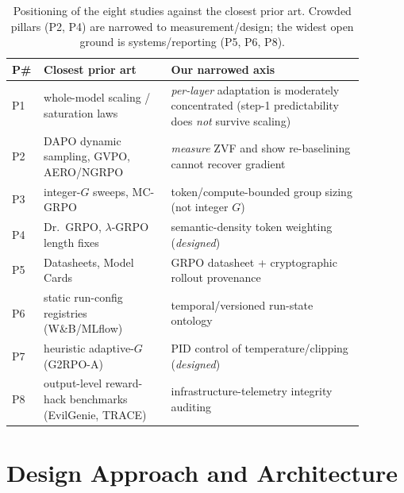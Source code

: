 \documentclass[12pt,a4paper]{report}
\begin{document}
\begin{table}[t]
\centering
\small
\setlength{\tabcolsep}{4pt}
\begin{tabular}{@{}L{0.045\linewidth}L{0.33\linewidth}L{0.50\linewidth}@{}}
\toprule
\textbf{P\#} & \textbf{Closest prior art} & \textbf{Our narrowed axis} \\
\midrule
P1 & whole-model scaling / saturation laws & \emph{per-layer} adaptation is moderately concentrated (step-1 predictability does \emph{not} survive scaling) \\
P2 & DAPO dynamic sampling, GVPO, AERO/NGRPO & \emph{measure} ZVF and show re-baselining cannot recover gradient \\
P3 & integer-$G$ sweeps, MC-GRPO & token/compute-bounded group sizing (not integer $G$) \\
P4 & Dr.\ GRPO, $\lambda$-GRPO length fixes & semantic-density token weighting (\emph{designed}) \\
P5 & Datasheets, Model Cards & GRPO datasheet + cryptographic rollout provenance \\
P6 & static run-config registries (W\&B/MLflow) & temporal/versioned run-state ontology \\
P7 & heuristic adaptive-$G$ (G2RPO-A) & PID control of temperature/clipping (\emph{designed}) \\
P8 & output-level reward-hack benchmarks (EvilGenie, TRACE) & infrastructure-telemetry integrity auditing \\
\bottomrule
\end{tabular}
\caption{Positioning of the eight studies against the closest prior art. Crowded
pillars (P2, P4) are narrowed to measurement/design; the widest open ground is
systems/reporting (P5, P6, P8).}
\label{tab:position}
\end{table}

\section{Design Approach and Architecture}
\label{sec:design}
\end{document}
